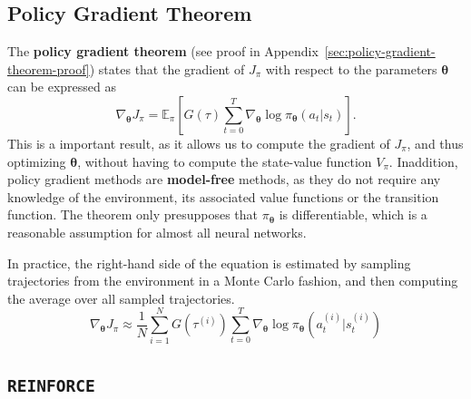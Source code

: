 \documentclass[12pt]{report}
\theoremstyle{definition}
\theoremstyle{remark}
\begin{document}
\subsection{Policy Gradient Theorem}
The \textbf{policy gradient theorem} (see proof in Appendix~\ref{sec:policy-gradient-theorem-proof}) states that the gradient of $J_\pi$ with respect to the parameters $\boldsymbol{\theta}$ can be expressed as
\begin{equation}\label{eq:policy-gradient-theorem}
    \nabla_{\boldsymbol{\theta}} J_\pi =  \mathbb{E}_\pi\left[G(\tau) \sum_{t=0}^{T} \nabla_{\boldsymbol{\theta}} \log \pi_{\boldsymbol{\theta}}(a_t | s_t)\right].
\end{equation}
This is a important result, as it allows us to compute the gradient of $J_\pi$, and thus optimizing $\boldsymbol{\theta}$, without having to compute the state-value function $V_\pi$. Inaddition, policy gradient methods are \textbf{model-free} methods, as they do not require any knowledge of the environment, its associated value functions or the transition function. The theorem only presupposes that $\pi_{\boldsymbol{\theta}}$ is differentiable, which is a reasonable assumption for almost all neural networks.

In practice, the right-hand side of the equation is estimated by sampling trajectories from the environment in a Monte Carlo fashion, and then computing the average over all sampled trajectories.
\begin{equation}
    \nabla_{\boldsymbol{\theta}} J_\pi \approx \frac{1}{N} \sum_{i=1}^{N} G(\tau^{(i)}) \sum_{t=0}^{T} \nabla_{\boldsymbol{\theta}} \log \pi_{\boldsymbol{\theta}}(a_t^{(i)} | s_t^{(i)})
\end{equation}

\subsection{\texttt{REINFORCE}}
\end{document}
